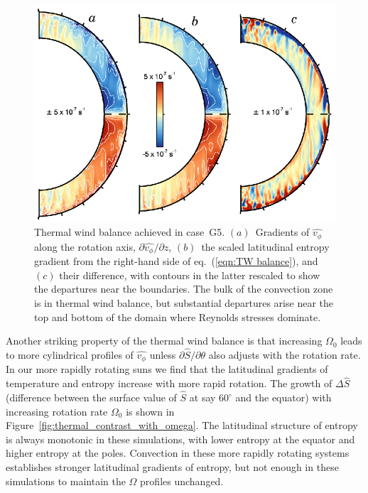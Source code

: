 \begin{figure}[!t]
  \begin{center}
    \includegraphics[width=0.7\linewidth]{figs/chapter_3/figure_7.eps}
  \end{center}
  \caption[Thermal wind balance achieved in case~G5]{Thermal wind balance achieved in case~G5.  
  $(a)$~Gradients of $\widehat{v_\phi}$ along the rotation axis, $\partial \widehat{v_\phi}/\partial z$,
  $(b)$~the scaled latitudinal entropy gradient from the
  right-hand side of eq.~(\ref{eqn:TW balance}), and $(c)$ their
  difference, with contours in the latter rescaled
  to show the departures near the boundaries.  The bulk of the
  convection zone is in thermal wind balance, but substantial
  departures arise near the top and bottom of the domain where
  Reynolds stresses dominate.
  \label{fig:TW balance}}
\end{figure}


Another striking property of the thermal wind balance is that
increasing $\Omega_0$ leads to more cylindrical profiles of $\widehat{v_\phi}$
unless $\partial \widehat{S}/\partial \theta$ also adjusts with the rotation
rate.  In our more rapidly rotating suns we find that the latitudinal
gradients of temperature and entropy increase with more rapid
rotation.  The growth of $\Delta \widehat{S}$ (difference between the
surface value of $\widehat{S}$ at say $60^\circ$ and the equator)
with increasing rotation rate $\Omega_0$ is shown in
Figure~\ref{fig:thermal_contrast_with_omega}.  The latitudinal
structure of entropy is always monotonic in these simulations, with
lower entropy at the equator and higher entropy at the poles.
Convection in these more rapidly rotating systems establishes stronger
latitudinal gradients of entropy, but not enough in these simulations to maintain
the $\Omega$ profiles unchanged.


